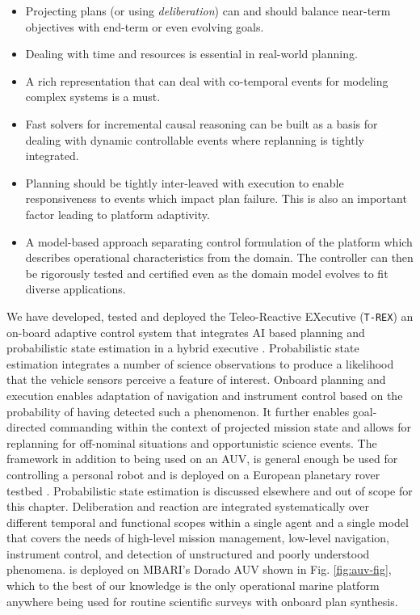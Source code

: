 \begin{itemize}

\item Projecting plans (or using \emph{deliberation}) can and should
  balance near-term objectives with end-term or even evolving goals.

\item Dealing with time and resources is essential in real-world
  planning.

\item A rich representation that can deal with co-temporal events for
  modeling complex systems is a must.

\item Fast solvers for incremental causal reasoning can be built as a
  basis for dealing with dynamic controllable events where replanning
  is tightly integrated.

\item Planning should be tightly inter-leaved with execution to enable
  responsiveness to events which impact plan failure. This is also an
  important factor leading to platform adaptivity.

\item A model-based approach separating control formulation of the
  platform which describes operational characteristics from the
  domain. The controller can then be rigorously tested and certified
  even as the domain model evolves to fit diverse applications.

\end{itemize}

We have developed, tested and deployed the Teleo-Reactive EXecutive
(\texttt{T-REX}) an on-board adaptive control system that integrates
AI based planning and probabilistic state estimation in a hybrid
executive \cite{mcgann08a,mcgann08b,py10}.  Probabilistic state
estimation integrates a number of science observations to produce a
likelihood that the vehicle sensors perceive a feature of
interest. Onboard planning and execution enables adaptation of
navigation and instrument control based on the probability of having
detected such a phenomenon. It further enables goal-directed
commanding within the context of projected mission state and allows
for replanning for off-nominal situations and opportunistic science
events. The framework in addition to being used on an AUV, is general
enough be used for controlling a personal robot \cite{mcgann2009} and
is deployed on a European planetary rover testbed
\cite{goac11}. Probabilistic state estimation is discussed elsewhere
\cite{mcgann08d} and out of scope for this chapter. Deliberation and
reaction are integrated systematically over different temporal and
functional scopes within a single agent and a single model that covers
the needs of high-level mission management, low-level navigation,
instrument control, and detection of unstructured and poorly
understood phenomena. \rx is deployed on MBARI's Dorado AUV shown in
Fig. \ref{fig:auv-fig}, which to the best of our knowledge is the only
operational marine platform anywhere being used for routine scientific
surveys with onboard plan synthesis.

